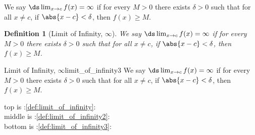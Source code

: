 \documentclass[10pt]{book}
\newtheorem{tmpdefinition}{Definition}[section]
\begin{document}
%
%

\mainmatter

\pagestyle{fancy}

\setcounter{chapter}{1}
\setcounter{section}{5}

{We say $\ds \lim_{x\rightarrow c} f(x)=\infty$ if for every $M>0$ there exists $\delta>0$ such that for all $x\neq c$, if  $\abs{x-c}<\delta$, then $f(x)\geq M$. }

\begin{tmpdefinition}[Limit of Infinity, $\infty$]\label{def:limit_of_infinity2}
We say $\ds \lim_{x\rightarrow c} f(x)=\infty$ if for every $M>0$ there exists $\delta>0$ such that for all $x\neq c$, if  $\abs{x-c}<\delta$, then $f(x)\geq M$. 
\end{tmpdefinition}

\begin{tmppdefinition}{Limit of Infinity, $\infty$}{limit_of_infinity3}
We say $\ds \lim_{x\rightarrow c} f(x)=\infty$ if for every $M>0$ there exists $\delta>0$ such that for all $x\neq c$, if  $\abs{x-c}<\delta$, then $f(x)\geq M$. 
\end{tmppdefinition}

\noindent
top is :\autoref{def:limit_of_infinity}:\\
middle is :\autoref{def:limit_of_infinity2}:\\
bottom is :\autoref{def:limit_of_infinity3}:

%




%
%
\end{document}
